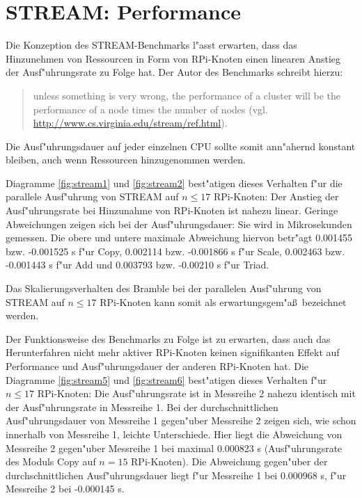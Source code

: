 \section{STREAM: Performance}\label{Interpretation-Stream}

Die Konzeption des STREAM-Benchmarks l"asst erwarten, dass das Hinzunehmen von Ressourcen in Form von RPi-Knoten einen linearen Anstieg der Ausf"uhrungsrate zu Folge hat. Der Autor des Benchmarks schreibt hierzu: 
\begin{quote}
\onehalfspacing
[\dots] unless something is very wrong, the performance of a cluster will be the performance of a node times the number of nodes (vgl. \url{http://www.cs.virginia.edu/stream/ref.html}).
\end{quote}
Die Ausf"uhrungsdauer auf jeder einzelnen CPU sollte somit ann"ahernd konstant bleiben, auch wenn Ressourcen hinzugenommen werden.

Diagramme \ref{fig:stream1} und \ref{fig:stream2} best"atigen dieses Verhalten f"ur die parallele Ausf"uhrung von STREAM auf $n\leq 17$ RPi-Knoten: Der Anstieg der  Ausf"uhrungsrate bei Hinzunahme von RPi-Knoten ist nahezu linear. Geringe Abweichungen zeigen sich bei der Ausf"uhrungsdauer: Sie wird in Mikrosekunden gemessen. Die obere und untere maximale Abweichung hiervon betr"agt 0.001455 bzw. -0.001525 s f"ur Copy, 0.002114 bzw. -0.001866 s f"ur Scale, 0.002463 bzw. -0.001443 s f"ur Add und 0.003793 bzw. -0.00210 s f"ur Triad. %

Das Skalierungsverhalten des Bramble bei der parallelen Ausf"uhrung von STREAM auf $n\leq 17$ RPi-Knoten kann somit als erwartungsgem"a\ss\ bezeichnet werden. 

Der Funktionsweise des Benchmarks zu Folge ist zu erwarten, dass auch das Herunterfahren nicht mehr aktiver RPi-Knoten keinen signifikanten Effekt auf Performance und Ausf"uhrungsdauer der anderen RPi-Knoten hat. Die Diagramme \ref{fig:stream5} und \ref{fig:stream6} best"atigen dieses Verhalten f"ur $n\leq 17$ RPi-Knoten: Die Ausf"uhrungsrate ist in Messreihe 2 nahezu identisch mit der Ausf"uhrungsrate in Messreihe 1. Bei der durchschnittlichen Ausf"uhrungsdauer von Messreihe 1 gegen"uber Messreihe 2 zeigen sich, wie schon innerhalb von Messreihe 1, leichte Unterschiede. Hier liegt die Abweichung von Messreihe 2 gegen"uber Messreihe 1 bei maximal 0.000823 s (Ausf"uhrungsrate des Moduls Copy auf $n=15$ RPi-Knoten). Die Abweichung gegen"uber der durchschnittlichen Ausf"uhrungsdauer liegt f"ur Messreihe 1 bei 0.000968 s, f"ur Messreihe 2 bei -0.000145 s. %

